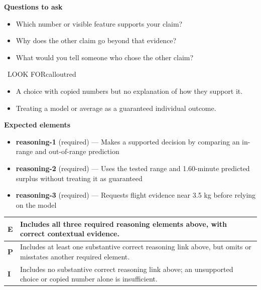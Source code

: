 \documentclass[11pt]{article}
\begin{document}
\textbf{Questions to ask}
\begin{itemize}[leftmargin=1.5em,itemsep=2pt,topsep=2pt]
  \item Which number or visible feature supports your claim?
  \item Why does the other claim go beyond that evidence?
  \item What would you tell someone who chose the other claim?
\end{itemize}

\begin{callout}{\IconWarn\ LOOK FOR}{calloutred}
\begin{itemize}[leftmargin=1.5em,itemsep=2pt,topsep=2pt]
  \item A choice with copied numbers but no explanation of how they support it.
  \item Treating a model or average as a guaranteed individual outcome.
\end{itemize}
\end{callout}


\textbf{Expected elements}
\begin{itemize}[leftmargin=1.5em,itemsep=2pt,topsep=2pt]
  \item \textbf{reasoning-1} (required) --- Makes a supported decision by comparing an in-range and out-of-range prediction
  \item \textbf{reasoning-2} (required) --- Uses the tested range and 1.60-minute predicted surplus without treating it as guaranteed
  \item \textbf{reasoning-3} (required) --- Requests flight evidence near 3.5 kg before relying on the model
\end{itemize}

{\small\renewcommand{\arraystretch}{1.25}
\noindent\begin{tabular}{|p{0.5in}|p{5.9in}|}
\hline
\textbf{E} & Includes all three required reasoning elements above, with correct contextual evidence. \\ \hline
\textbf{P} & Includes at least one substantive correct reasoning link above, but omits or misstates another required element. \\ \hline
\textbf{I} & Includes no substantive correct reasoning link above; an unsupported choice or copied number alone is insufficient. \\ \hline
\end{tabular}}
\end{document}
